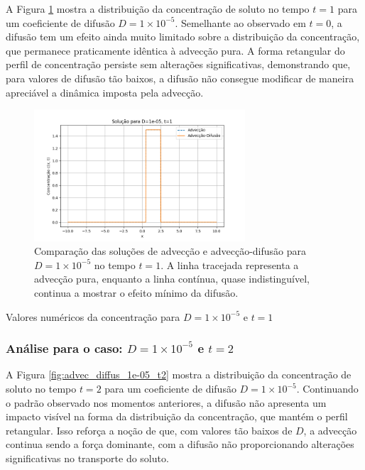 A Figura \ref{fig:advec_diffus_1e-05_t1} mostra a distribuição da concentração de soluto no tempo \( t = 1 \) para um coeficiente de difusão \( D = 1 \times 10^{-5} \). Semelhante ao observado em \( t = 0 \), a difusão tem um efeito ainda muito limitado sobre a distribuição da concentração, que permanece praticamente idêntica à advecção pura. A forma retangular do perfil de concentração persiste sem alterações significativas, demonstrando que, para valores de difusão tão baixos, a difusão não consegue modificar de maneira apreciável a dinâmica imposta pela advecção.

\begin{figure}[H]
    \centering
    \includegraphics[width=0.7\textwidth]{code/plot/Advec_Difus_t1_D1e-05.png}
    \caption{Comparação das soluções de advecção e advecção-difusão para \( D = 1 \times 10^{-5} \) no tempo \( t = 1 \). A linha tracejada representa a advecção pura, enquanto a linha contínua, quase indistinguível, continua a mostrar o efeito mínimo da difusão.}
    \label{fig:advec_diffus_1e-05_t1}
\end{figure}

\begin{table}[H]
    \centering
    \caption{Valores numéricos da concentração para \( D = 1 \times 10^{-5} \) e \( t = 1 \)}
    
\end{table}



\subsubsection{Análise para o caso: \( D = 1 \times 10^{-5} \) e \( t = 2 \)}

A Figura \ref{fig:advec_diffus_1e-05_t2} mostra a distribuição da concentração de soluto no tempo \( t = 2 \) para um coeficiente de difusão \( D = 1 \times 10^{-5} \). Continuando o padrão observado nos momentos anteriores, a difusão não apresenta um impacto visível na forma da distribuição da concentração, que mantém o perfil retangular. Isso reforça a noção de que, com valores tão baixos de \( D \), a advecção continua sendo a força dominante, com a difusão não proporcionando alterações significativas no transporte do soluto.

